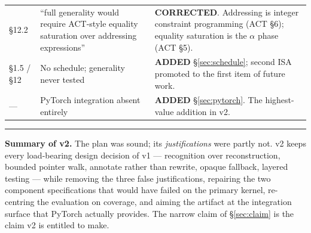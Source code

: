 \documentclass[11pt,a4paper]{article}
\begin{document}
{\begin{longtable}{@{}>{\raggedright\arraybackslash}p{2.4cm} >{\raggedright\arraybackslash}p{8.7cm} >{\raggedright\arraybackslash}p{4.2cm}@{}}
\addlinespace
\S12.2 & ``full generality would require ACT-style equality saturation over addressing expressions'' &
\textbf{CORRECTED}. Addressing is integer constraint programming (ACT \S6); equality saturation is the
$\alpha$ phase (ACT \S5). \\
\addlinespace
\S1.5 / \S12 & No schedule; generality never tested & \textbf{ADDED} \S\ref{sec:schedule}; second ISA promoted
to the first item of future work. \\
\addlinespace
--- & PyTorch integration absent entirely & \textbf{ADDED} \S\ref{sec:pytorch}. The highest-value addition
in v2. \\
\end{longtable}
}

\vspace{1.2em}
\noindent\rule{\textwidth}{0.3pt}

\noindent\textbf{Summary of v2.} The plan was sound; its \emph{justifications} were partly not. v2 keeps
every load-bearing design decision of v1 --- recognition over reconstruction, bounded pointer walk, annotate
rather than rewrite, opaque fallback, layered testing --- while removing the three false justifications,
repairing the two component specifications that would have failed on the primary kernel, re-centring the
evaluation on coverage, and aiming the artifact at the integration surface that PyTorch actually provides.
The narrow claim of \S\ref{sec:claim} is the claim v2 is entitled to make.
\end{document}
